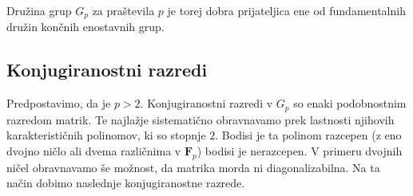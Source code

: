 \documentclass[11pt]{book}
\def\FF{\mathbf{F}}
\theoremstyle{definition}
\theoremstyle{zgled}
\theoremstyle{zgledbrezstevilke}
\theoremstyle{odprtproblem}
\theoremstyle{domacanaloga}
\theoremstyle{izrek}
\begin{document}
Družina grup $G_p$ za praštevila $p$ je torej dobra prijateljica ene od fundamentalnih družin končnih enostavnih grup.

\subsection{Konjugiranostni razredi}

Predpostavimo, da je $p > 2$. Konjugiranostni razredi v $G_p$ so enaki podobnostnim razredom matrik. Te najlažje sistematično obravnavamo prek lastnosti njihovih karakterističnih polinomov, ki so stopnje $2$. Bodisi je ta polinom razcepen (z eno dvojno ničlo ali dvema različnima v $\FF_p$) bodisi je nerazcepen. V primeru dvojnih ničel obravnavamo še možnost, da matrika morda ni diagonalizabilna. Na ta način dobimo naslednje konjugiranostne razrede.
\end{document}
